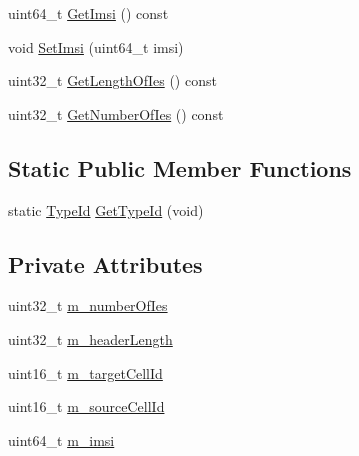 \begin{DoxyCompactItemize}
\item 
uint64\+\_\+t \hyperlink{classns3_1_1EpcX2NotifyCoordinatorHandoverFailedHeader_ab8cd55294fbc41e3214c71f729c5616e}{Get\+Imsi} () const 
\item 
void \hyperlink{classns3_1_1EpcX2NotifyCoordinatorHandoverFailedHeader_a0a0535f8c05c19069af1fae784dda5be}{Set\+Imsi} (uint64\+\_\+t imsi)
\item 
uint32\+\_\+t \hyperlink{classns3_1_1EpcX2NotifyCoordinatorHandoverFailedHeader_a7bb74970752b3b5f751ff661059829e8}{Get\+Length\+Of\+Ies} () const 
\item 
uint32\+\_\+t \hyperlink{classns3_1_1EpcX2NotifyCoordinatorHandoverFailedHeader_aa5ceee7cdb9d75e16f22d1f547cd22ab}{Get\+Number\+Of\+Ies} () const 
\end{DoxyCompactItemize}
\subsection*{Static Public Member Functions}
\begin{DoxyCompactItemize}
\item 
static \hyperlink{classns3_1_1TypeId}{Type\+Id} \hyperlink{classns3_1_1EpcX2NotifyCoordinatorHandoverFailedHeader_ab23eee978969b2d7a58818d01b3d341d}{Get\+Type\+Id} (void)
\end{DoxyCompactItemize}
\subsection*{Private Attributes}
\begin{DoxyCompactItemize}
\item 
uint32\+\_\+t \hyperlink{classns3_1_1EpcX2NotifyCoordinatorHandoverFailedHeader_a9da0a0df0f915b75de8e54764a1d755d}{m\+\_\+number\+Of\+Ies}
\item 
uint32\+\_\+t \hyperlink{classns3_1_1EpcX2NotifyCoordinatorHandoverFailedHeader_afd479c6833304f96b4788629db90fb2b}{m\+\_\+header\+Length}
\item 
uint16\+\_\+t \hyperlink{classns3_1_1EpcX2NotifyCoordinatorHandoverFailedHeader_abcd1f20166776d16c491d8f802ec3f92}{m\+\_\+target\+Cell\+Id}
\item 
uint16\+\_\+t \hyperlink{classns3_1_1EpcX2NotifyCoordinatorHandoverFailedHeader_a9a15cfef976046dde581b91a1545ddb3}{m\+\_\+source\+Cell\+Id}
\item 
uint64\+\_\+t \hyperlink{classns3_1_1EpcX2NotifyCoordinatorHandoverFailedHeader_a1d0ab7e4ff5fe4810ecdc2e22409ef3d}{m\+\_\+imsi}
\end{DoxyCompactItemize}
